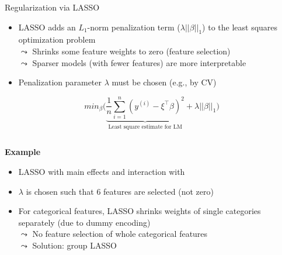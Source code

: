 \documentclass[11pt,compress,t,notes=noshow, aspectratio=169, xcolor=table]{beamer}
\begin{document}
\begin{frame}{Regularization via LASSO }
\begin{itemize}
    \item LASSO adds an $L_1$-norm penalization term ($\lambda||\beta||_1$) to the least squares optimization problem\\
    $\leadsto$ Shrinks some feature weights to zero (feature selection)\\
    $\leadsto$ Sparser models (with fewer features) are more interpretable
    \item Penalization parameter $\lambda$ must be chosen (e.g., by CV) %
\end{itemize}
$$
min_{\beta} \bigg(\underbrace{\frac{1}{n} \sum_{i=1}^{n} (y^{(i)} - {\xi}^{\top} \beta)^2}_\text{Least square estimate for LM} + \lambda||\beta||_1\bigg)
$$
\pause
\begin{columns}[T, totalwidth=\linewidth]
\begin{column}{0.65\textwidth}
\textbf{Example}
\begin{itemize}
    \item LASSO with main effects and interaction  with 
    \item $\lambda$ is chosen such that 6 features are selected (not zero)
    \item For categorical features, LASSO shrinks weights of single categories separately (due to dummy encoding)\\
    $\leadsto$ No feature selection of whole categorical features\\
    $\leadsto$ Solution: group LASSO 
\end{itemize}
\end{column}

\end{columns}
\end{frame}
\end{document}
